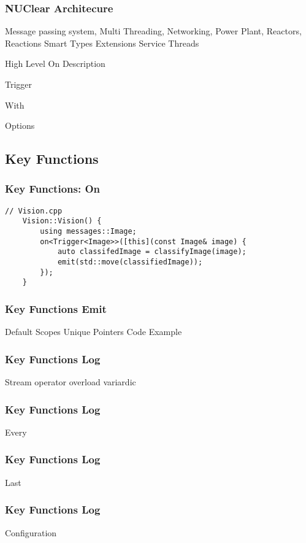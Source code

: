 \documentclass{beamer}
\begin{document}
\begin{frame}
    \frametitle{NUClear Architecure}
	Message passing system,
	Multi Threading,
	Networking,
	Power Plant,
	Reactors,
	Reactions
	Smart Types
	Extensions
	Service Threads
\end{frame}

\begin{frame}
	High Level On Description
\end{frame}

\begin{frame}
	Trigger
\end{frame}

\begin{frame}
	With
\end{frame}

\begin{frame}
	Options
\end{frame}

\subsection{Key Functions}
\begin{frame}[fragile]
    \frametitle{Key Functions: On}
	\begin{lstlisting}[language=nuclear]
	// Vision.cpp
	Vision::Vision() {
	    using messages::Image;
	    on<Trigger<Image>>([this](const Image& image) {
	        auto classifedImage = classifyImage(image);
	        emit(std::move(classifiedImage));
	    });
	}
	\end{lstlisting}
\end{frame}

\begin{frame}
    \frametitle{Key Functions Emit}
	Default
	Scopes
	Unique Pointers
	Code Example
\end{frame}

\begin{frame}
    \frametitle{Key Functions Log}
	Stream operator overload
	variardic
\end{frame}

\begin{frame}
    \frametitle{Key Functions Log}
	Every
\end{frame}

\begin{frame}
    \frametitle{Key Functions Log}
	Last
\end{frame}

\begin{frame}
    \frametitle{Key Functions Log}
	Configuration
\end{frame}
\end{document}
